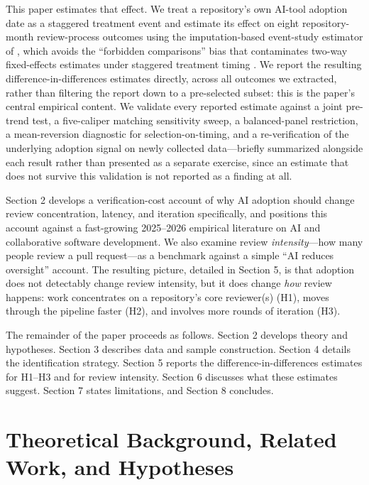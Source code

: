 \documentclass[12pt]{article}
\begin{document}
This paper estimates that effect. We treat a repository's own AI-tool
adoption date as a staggered treatment event and estimate its effect on
eight repository-month review-process outcomes using the imputation-based
event-study estimator of \citet{borusyak2024revisiting}, which avoids the
``forbidden comparisons'' bias that contaminates two-way fixed-effects
estimates under staggered treatment timing
\cite{callaway2021difference}. We report the resulting
difference-in-differences estimates directly, across all outcomes we
extracted, rather than filtering the report down to a pre-selected subset:
this is the paper's central empirical content. We validate every reported
estimate against a joint pre-trend test, a five-caliper matching
sensitivity sweep, a balanced-panel restriction, a mean-reversion
diagnostic for selection-on-timing, and a re-verification of the
underlying adoption signal on newly collected data---briefly summarized
alongside each result rather than presented as a separate exercise, since
an estimate that does not survive this validation is not reported as a
finding at all.

Section 2 develops a verification-cost account of why AI adoption should
change review concentration, latency, and iteration specifically, and
positions this account against a fast-growing 2025--2026 empirical
literature on AI and collaborative software development. We also examine
review \emph{intensity}---how many people review a pull request---as a
benchmark against a simple ``AI reduces oversight'' account. The
resulting picture, detailed in Section 5, is that adoption does not
detectably change review intensity, but it does change \emph{how} review
happens: work concentrates on a repository's core reviewer(s) (H1),
moves through the pipeline faster (H2), and involves more rounds of
iteration (H3).

The remainder of the paper proceeds as follows. Section 2 develops theory
and hypotheses. Section 3 describes data and sample construction. Section
4 details the identification strategy. Section 5 reports the
difference-in-differences estimates for H1--H3 and for review intensity.
Section 6 discusses what these estimates suggest. Section 7 states
limitations, and Section 8 concludes.

\section{Theoretical Background, Related Work, and Hypotheses}
\label{sec:theory}
\end{document}

